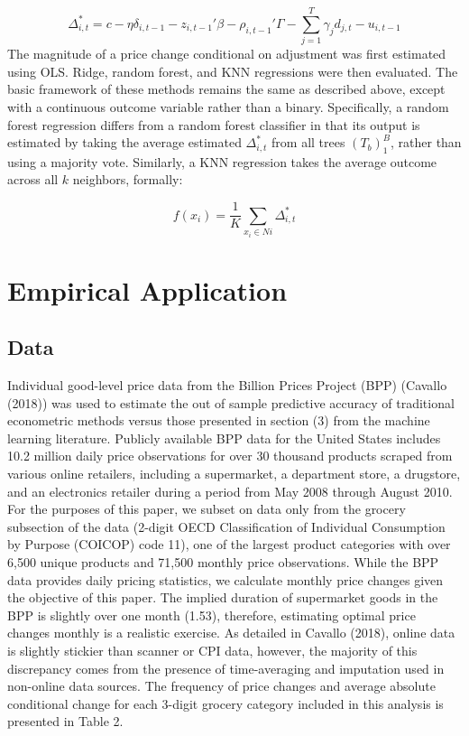 \documentclass[11pt]{article}
\begin{document}
    \begin{equation*}
    \Delta^{*}_{i,t} =  c - \eta \delta_{i,t-1} - z_{i,t-1}'\beta - \rho_{i,t-1}'\Gamma - \sum_{j=1}^{T} \gamma_{j}d_{j,t} - u_{i,t-1}
    \end{equation*}
The magnitude of a price change conditional on adjustment was first estimated using OLS. Ridge, random forest, and KNN regressions were then evaluated. The basic framework of these methods remains the same as described above, except with a continuous outcome variable rather than a binary. Specifically, a random forest regression differs from a random forest classifier in that its output is estimated by taking the average estimated $ \Delta^{*}_{i,t}$  from all trees $(T_{b})_1^B$, rather than using a majority vote. Similarly, a KNN regression takes the average outcome across all $k$ neighbors, formally:

%
\begin{equation*}
    f(x_{i}) = \frac{1}{K}\sum_{x_{i}\in N{i}} \Delta^{*}_{i,t} 
\end{equation*}


\section{Empirical Application}

\subsection{Data}
Individual good-level price data from the Billion Prices Project (BPP) (Cavallo (2018)) was used to estimate the out of sample predictive accuracy of traditional econometric methods versus those presented in section (3) from the machine learning literature. Publicly available BPP data for the United States includes 10.2 million daily price observations for over 30 thousand products scraped from various online retailers, including a supermarket, a department store, a drugstore, and an electronics retailer during a period from May 2008 through August 2010. For the purposes of this paper, we subset on data only from the grocery subsection of the data (2-digit OECD Classification of Individual Consumption by Purpose (COICOP) code 11), one of the largest product categories with over 6,500 unique products and 71,500 monthly price observations. While the BPP data provides daily pricing statistics, we calculate monthly price changes given the objective of this paper. The implied duration of supermarket goods in the BPP is slightly over one month (1.53), therefore, estimating optimal price changes monthly is a realistic exercise. As detailed in Cavallo (2018), online data is slightly stickier than scanner or CPI data, however, the majority of this discrepancy comes from the presence of time-averaging and imputation used in non-online data sources. The frequency of price changes and average absolute conditional change for each 3-digit grocery category included in this analysis is presented in Table 2.
\end{document}
